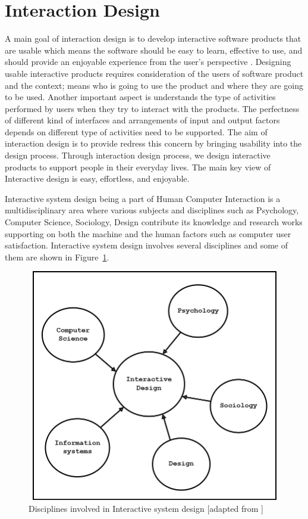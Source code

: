 \section{Interaction Design}
\label{sec:ID}
A main goal of interaction design is to develop interactive software products
that are usable which means the software should be easy to learn, effective to
use, and should provide an enjoyable experience from the user's perspective
\cite{preece2002interaction}. Designing usable interactive products
requires consideration of the users of software product and the context; means who is
going to use the product and where they are going to be used. Another important
aspect is understands the type of activities performed by users when they
try to interact with the products. The perfectness of different kind of
interfaces and arrangements of input and output factors depends on different type of
activities need to be supported. The aim of interaction design is to provide
redress this concern by bringing usability into the design process. Through
interaction design process, we design interactive products to support people in
their everyday  lives. The main key view of Interactive design is easy,
effortless, and enjoyable.

Interactive system design being a part of Human Computer Interaction is a
multidisciplinary area where various subjects and disciplines such as
Psychology, Computer Science, Sociology, Design contribute its knowledge and
research works supporting on both the machine and the human factors such as
computer user satisfaction. Interactive system design involves several
disciplines and some of them are shown in Figure~\ref{DisciplinesInvolvedID}.
\begin{figure}[h!t]
    \centering
      \includegraphics[width=5.5in,height=4in]{ch2/DisciplinesInvolvedID}
  \caption{Disciplines involved in Interactive system design [adapted from \cite{Love:2005:UMH:1076935,preece2002interaction}]}
  \label{DisciplinesInvolvedID}
\end{figure}


